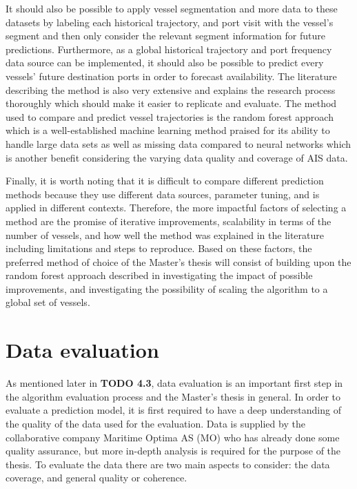 It should also be possible to apply vessel segmentation and more data to these datasets by labeling each historical trajectory, and port visit with the vessel’s segment and then only consider the relevant segment information for future predictions. Furthermore, as a global historical trajectory and port frequency data source can be implemented, it should also be possible to predict every vessels’ future destination ports in order to forecast availability.  The literature describing the method is also very extensive and explains the research process thoroughly which should make it easier to replicate and evaluate. The method used to compare and predict vessel trajectories is the random forest approach which is a well-established machine learning method praised for its ability to handle large data sets as well as missing data compared to neural networks \parencite{Randomforest_website} which is another benefit considering the varying data quality and coverage of AIS data.

Finally, it is worth noting that it is difficult to compare different prediction methods because they use different data sources, parameter tuning, and is applied in different contexts. Therefore, the more impactful factors of selecting a method are the promise of iterative improvements, scalability in terms of the number of vessels, and how well the method was explained in the literature including limitations and steps to reproduce. Based on these factors, the preferred method of choice of the Master’s thesis will consist of building upon the random forest approach described in \cite{Zhang2020AISApproach} investigating the impact of possible improvements, and investigating the possibility of scaling the algorithm to a global set of vessels.


\section{Data evaluation}

As mentioned later in \textbf{TODO 4.3}, data evaluation is an important first step in the algorithm evaluation process and the Master’s thesis in general. In order to evaluate a prediction model, it is first required to have a deep understanding of the quality of the data used for the evaluation. Data is supplied by the collaborative company Maritime Optima AS (MO) who has already done some quality assurance, but more in-depth analysis is required for the purpose of the thesis. To evaluate the data there are two main aspects to consider: the data coverage, and general quality or coherence.

